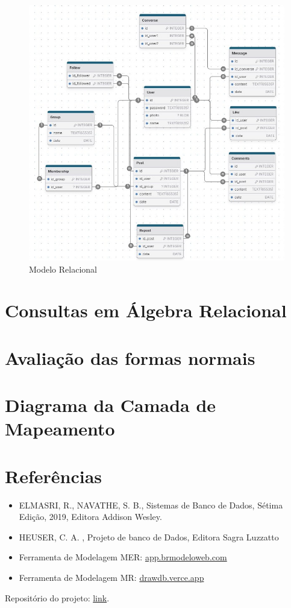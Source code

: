 \documentclass{article}
\begin{document}
\begin{figure}[!ht]
        \centering
        \includegraphics[width=1\textwidth]{imagens/mr.jpg}
        \caption{Modelo Relacional}
\end{figure}

\section{Consultas em Álgebra Relacional}

\section{Avaliação das formas normais}

\section{Diagrama da Camada de Mapeamento}

\section{Referências}
\begin{itemize}
        \item ELMASRI, R., NAVATHE, S. B., Sistemas de Banco de Dados, Sétima Edição, 2019, Editora Addison Wesley.
        \item HEUSER, C. A. , Projeto de banco de Dados, Editora Sagra Luzzatto
        \item Ferramenta de Modelagem MER: \href{https://app.brmodeloweb.com/#!/conceptual/66dd8939bb821248818df271}{app.brmodeloweb.com}
        \item Ferramenta de Modelagem MR: \href{https://drawdb.vercel.app/}{drawdb.verce.app}
\end{itemize}

Repositório do projeto: \href{https://github.com/qrno/BD-2024-1}{link}.
\end{document}
